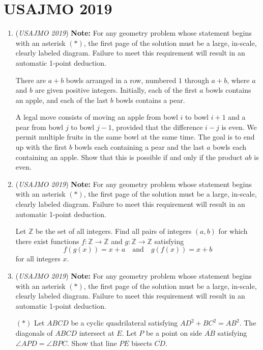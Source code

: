 \section{USAJMO 2019}
        \begin{enumerate}
        	\item (\textit{USAJMO 2019}) \textbf{Note:} For any geometry problem whose statement begins with an asterisk $(*)$, the first page of the solution must be a large, in-scale, clearly labeled diagram. Failure to meet this requirement will result in an automatic 1-point deduction.


 There are $a+b$ bowls arranged in a row, numbered $1$ through $a+b$, where $a$ and $b$ are given positive integers. Initially, each of the first $a$ bowls contains an apple, and each of the last $b$ bowls contains a pear.


 A legal move consists of moving an apple from bowl $i$ to bowl $i+1$ and a pear from bowl $j$ to bowl $j-1$, provided that the difference $i-j$ is even. We permit multiple fruits in the same bowl at the same time. The goal is to end up with the first $b$ bowls each containing a pear and the last $a$ bowls each containing an apple. Show that this is possible if and only if the product $ab$ is even.


 

	\item (\textit{USAJMO 2019}) \textbf{Note:} For any geometry problem whose statement begins with an asterisk $(*)$, the first page of the solution must be a large, in-scale, clearly labeled diagram. Failure to meet this requirement will result in an automatic 1-point deduction.


 Let $\mathbb Z$ be the set of all integers. Find all pairs of integers $(a,b)$ for which there exist functions $f:\mathbb Z\rightarrow\mathbb Z$ and $g:\mathbb Z\rightarrow\mathbb Z$ satisfying 
 \[f(g(x))=x+a\quad\text{and}\quad g(f(x))=x+b\] for all integers $x$.


 

	\item (\textit{USAJMO 2019}) \textbf{Note:} For any geometry problem whose statement begins with an asterisk $(*)$, the first page of the solution must be a large, in-scale, clearly labeled diagram. Failure to meet this requirement will result in an automatic 1-point deduction.


 $(*)$  Let $ABCD$ be a cyclic quadrilateral satisfying $AD^2+BC^2=AB^2$. The diagonals of $ABCD$ intersect at $E$. Let $P$ be a point on side $\overline{AB}$ satisfying $\angle APD=\angle BPC$. Show that line $PE$ bisects $\overline{CD}$.



\end{enumerate}
